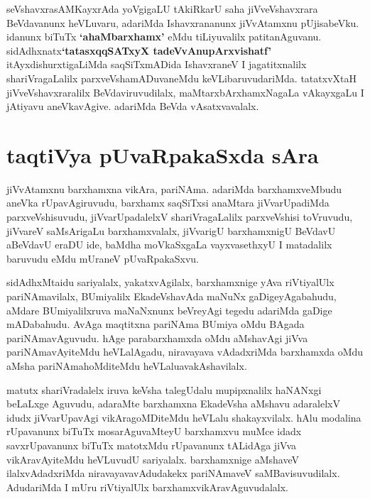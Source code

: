\begin{artha}
seVshavxrasAMKayxrAda yoVgigaLU tAkiRkarU saha jiVveVshavxrara
BeVdavanunx heVLuvaru, adariMda Ishavxrananunx jiVvAtamxnu
pUjisabeVku. idanunx biTuTx \textbf{`ahaMbarxhamx'} eMdu tiLiyuvalilx
patitanAguvanu. sidAdhxnatx\ndash\textbf{`tatasxqqSATxyX tadeVvAnupArxvishatf'}
itAyxdishurxtigaLiMda saqSiTxmADida IshavxraneV I jagatitxnalilx
shariVragaLalilx parxveVshamADuvaneMdu keVLibaruvudariMda. tatatxvXtaH
jiVveVshavxraralilx BeVdaviruvudilalx, maMtarxbArxhamxNagaLa
vAkayxgaLu I jAtiyavu aneVkavAgive. adariMda BeVda vAsatxvavalalx. 
\end{artha}

\section*{taqtiVya pUvaRpakaSxda sAra}

\begin{artha}
jiVvAtamxnu barxhamxna vikAra, pariNAma. adariMda barxhamxveMbudu aneVka rUpavAgiruvudu, barxhamx saqSiTxsi anaMtara jiVvarUpadiMda parxveVshisuvudu, jiVvarUpadalelxV shariVragaLalilx parxveVshisi toVruvudu, jiVvareV  saMsArigaLu barxhamxvalalx, jiVvarigU barxhamxnigU BeVdavU aBeVdavU eraDU ide, baMdha moVkaSxgaLa vayxvasethxyU I matadalilx baruvudu \ndash eMdu mUraneV pUvaRpakaSxvu.
\end{artha}

\begin{artha}
sidAdhxMta\ndash idu sariyalalx, yakatxvAgilalx, barxhamxnige yAva
riVtiyalUlx  pariNAmavilalx, BUmiyalilx EkadeVshavAda maNuNx
gaDigeyAgabahudu, aMdare BUmiyalilxruva maNaNxnunx beVreyAgi tegedu
adariMda gaDige mADabahudu. AvAga maqtitxna pariNAma BUmiya oMdu
BAgada pariNAmavAguvudu. hAge parabarxhamxda oMdu aMshavAgi jiVva
pariNAmavAyiteMdu heVLalAgadu, niravayava vAdadxriMda barxhamxda oMdu
aMsha pariNAmahoMditeMdu heVLaluavakAshavilalx.
\end{artha}

\begin{artha}
matutx shariVradalelx iruva keVsha talegUdalu mupipxnalilx haNANxgi
beLaLxge Aguvudu, adaraMte  barxhamxna EkadeVsha aMshavu adaralelxV
idudx jiVvarUpavAgi vikAragoMDiteMdu heVLalu shakayxvilalx. hAlu
modalina rUpavanunx biTuTx mosarAguvaMteyU barxhamxvu muMce idadx
savxrUpavanunx biTuTx matotxMdu rUpavanunx tALidAga jiVva
vikAravAyiteMdu heVLuvudU sariyalalx. barxhamxnige aMshaveV
ilalxvAdadxriMda niravayavavAdudakekx pariNAmaveV saMBavisuvudilalx.
AdudariMda I mUru riVtiyalUlx barxhamxvikAravAguvudalalx.
\end{artha}

